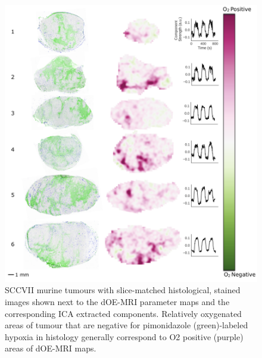 \begin{figure}[htbp]
   \centering
   \includegraphics[width=\textwidth]{oemri/oemri-images/oemri_sccfigure.png} %
   \caption{SCCVII murine tumours with slice-matched histological, stained images shown next to the dOE-MRI parameter maps and the corresponding ICA extracted components.
Relatively oxygenated areas of tumour that are negative for pimonidazole (green)-labeled hypoxia in histology generally correspond to O2 positive (purple) areas of dOE-MRI maps.}
   \label{sccfigure}
\end{figure}

